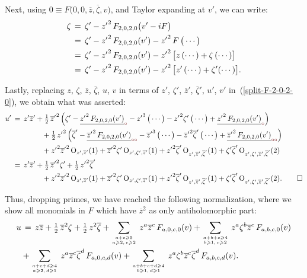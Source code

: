 \documentclass[12pt,twoside,leqno,openany]{amsart}
\begin{document}
Next, using $0 \equiv F\big(0, 0, \overline{z}, \overline{\zeta}, 
v\big)$, and Taylor expanding at $v'$, we can write:
\[
\aligned
\zeta
&
\,=\,
\zeta'
-
{z'}^2\,F_{2,0,2,0}\big(v'-iF\big)
\\
&
\,=\,
\zeta'
-
{z'}^2\,
F_{2,0,2,0}(v')
-
{z'}^2\,F\,\big(\cdots\big)
\\
&
\,=\,
\zeta'
-
{z'}^2\,
F_{2,0,2,0}(v')
-
{z'}^2\,
\big[
z\,(\cdots)
+
\zeta\,(\cdots)
\big]
\\
&
\,=\,
\zeta'
-
{z'}^2\,
F_{2,0,2,0}(v')
-
{z'}^2\,
\big[
z'\,(\cdots)
+
\zeta'(\cdots)
\big].
\endaligned
\]

Lastly, replacing $z$, $\zeta$,  $\overline{z}$,
$\overline{\zeta}$, $u$, $v$ in terms of 
$z'$, $\zeta'$, $\overline{z}'$, $\overline{\zeta}'$,
$u'$, $v'$ in~({\ref{split-F-2-0-2-0}}), 
we obtain what was asserted:
\begin{align*}
u'
&
\,=\,
z'\overline{z}'
+
\tfrac{1}{2}\,
{\overline{z}'}^2\,
\Big(
\zeta'
-
\zero{
{z'}^2\,F_{2,0,2,0}(v')}
-
{z'}^3\,\big(\cdots\big)
-
{z'}^2\zeta'\,\big(\cdots\big)
+
\zero{
{z'}^2\,F_{2,0,2,0}(v')}
\Big)
\\
&
\ \ \ \ \ \ \ \ \ \ \ \ \,
+
\tfrac{1}{2}\,
{z'}^2\,
\Big(
\overline{\zeta}'
-
\zerozero{
{\overline{z}'}^2\,F_{2,0,2,0}(v')}
-
{\overline{z}'}^3\,\big(\cdots\big)
-
{\overline{z}'}^2\overline{\zeta}'\,\big(\cdots\big)
+
\zerozero{
{\overline{z}'}^2\,F_{2,0,2,0}(v')}
\Big)
\\
&
\ \ \ \ \ \ \ \ \ \ \ \ \,
+
{z'}^2{\overline{z}'}^2\,
{\rm O}_{z',\overline{z}'}(1)
+
{\overline{z}'}^2\zeta'\,
{\rm O}_{z',\zeta',\overline{z}'}(1)
+
{z'}^2\overline{\zeta}'\,
{\rm O}_{z',\overline{z}',\overline{\zeta}'}(1)
+
\zeta'\overline{\zeta}'\,
{\rm O}_{z',\zeta',\overline{z}',\overline{\zeta}'}(2)
\\
&
\,=\,
z'\overline{z}'
+
\tfrac{1}{2}\,
{\overline{z}'}^2\zeta'
+
\tfrac{1}{2}\,
{z'}^2\overline{\zeta}'
\\
&
\ \ \ \ \ \ \ \ \ \ \ \ \,
+
{z'}^2{\overline{z}'}^2\,
{\rm O}_{z',\overline{z}'}(1)
+
{\overline{z}'}^2\zeta'\,
{\rm O}_{z',\zeta',\overline{z}'}(1)
+
{z'}^2\overline{\zeta}'\,
{\rm O}_{z',\overline{z}',\overline{\zeta}'}(1)
+
\zeta'\overline{\zeta}'\,
{\rm O}_{z',\zeta',\overline{z}',\overline{\zeta}'}(2).
\qedhere
\end{align*}
\endproof

Thus, dropping primes, we have reached the following
normalization, where we 
show all monomials in $F$ which have
$\overline{z}^2$ as only antiholomorphic part:
\[
\aligned
u
&
\,=\,
z\overline{z}
+
\tfrac{1}{2}\,
\overline{z}^2\zeta
+
\tfrac{1}{2}\,
z^2\overline{\zeta}
+
\sum_{a+c\geqslant 5
\atop
a\geqslant 2,\,c\geqslant 2}\,
z^a\overline{z}^c\,
F_{a,0,c,0}(v)
+
\sum_{a+b+c\geqslant 4
\atop
b\geqslant 1,\,c\geqslant 2}\,
z^a\zeta^b\overline{z}^c\,
F_{a,b,c,0}(v)
\\
&
+
\sum_{a+c+d\geqslant 4
\atop
a\geqslant 2,\,d\geqslant 1}\,
z^a\overline{z}^c\overline{\zeta}^d\,
F_{a,0,c,d}(v)
+
\sum_{a+b+c+d\geqslant 4
\atop
b\geqslant 1,\,d\geqslant 1}\,
z^a\zeta^b\overline{z}^c\overline{\zeta}^d\,
F_{a,b,c,d}(v).
\endaligned
\]
\end{document}
